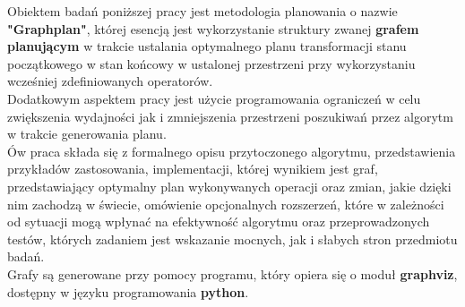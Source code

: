\begin{streszczenie}
Obiektem badań poniższej pracy jest metodologia planowania
o nazwie \textbf{"Graphplan"}, której esencją jest wykorzystanie
struktury zwanej \textbf{grafem planującym} w trakcie ustalania optymalnego planu transformacji
stanu początkowego w stan końcowy w ustalonej przestrzeni przy wykorzystaniu wcześniej zdefiniowanych
operatorów. \\
Dodatkowym aspektem pracy jest użycie programowania ograniczeń w celu zwiększenia wydajności jak i zmniejszenia
przestrzeni poszukiwań przez algorytm w trakcie generowania planu. \\
Ów praca składa się z formalnego opisu przytoczonego algorytmu, przedstawienia przykładów zastosowania,
implementacji, której wynikiem jest graf, przedstawiający optymalny plan wykonywanych operacji oraz zmian, jakie dzięki nim zachodzą w świecie,
omówienie opcjonalnych rozszerzeń, które w zależności od sytuacji mogą wpłynać na efektywność algorytmu
oraz przeprowadzonych testów, których zadaniem jest wskazanie mocnych, jak i słabych stron przedmiotu badań. \\
Grafy są generowane przy pomocy programu, który opiera się o moduł \textbf{graphviz}, dostępny w języku programowania \textbf{python}.

\end{streszczenie}
